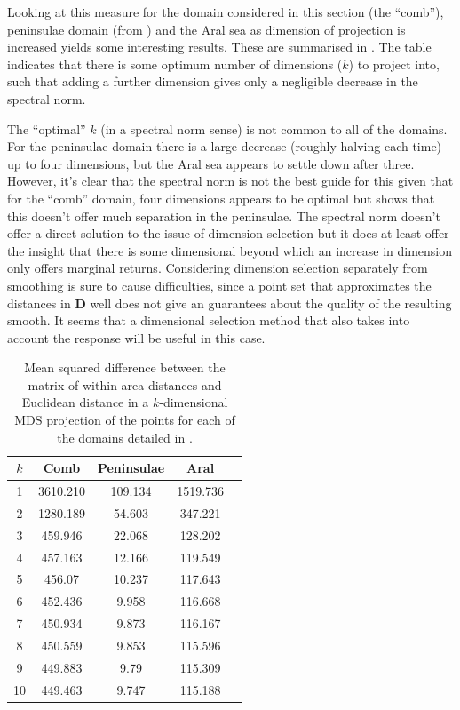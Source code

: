 Looking at this measure for the domain considered in this section (the ``comb''), peninsulae domain (from ) and the Aral sea as dimension of projection is increased yields some interesting results. These are summarised in . The table indicates that there is some optimum number of dimensions ($k$) to project into, such that adding a further dimension gives only a negligible decrease in the spectral norm. 

The ``optimal'' $k$ (in a spectral norm sense) is not common to all of the domains. For the peninsulae domain there is a large decrease (roughly halving each time) up to four dimensions, but the Aral sea appears to settle down after three. However, it's clear that the spectral norm is not the best guide for this given that for the ``comb'' domain, four dimensions appears to be optimal but  shows that this doesn't offer much separation in the peninsulae. The spectral norm doesn't offer a direct solution to the issue of dimension selection but it does at least offer the insight that there is some dimensional beyond which an increase in dimension only offers marginal returns. Considering dimension selection separately from smoothing is sure to cause difficulties, since a point set that approximates the distances in $\mathbf{D}$ well does not give an guarantees about the quality of the resulting smooth. It seems that a dimensional selection method that also takes into account the response will be useful in this case.

\begin{table}[htb]
\centering
\begin{tabular}{c c c c c}
$k$ & Comb  & Peninsulae & Aral\\ 
\hline
1  &  3610.210  &  109.134  &  1519.736 \\ 
2  &  1280.189  &  54.603  &  347.221 \\ 
3  &  459.946  &  22.068  &  128.202 \\ 
4  &  457.163  &  12.166  &  119.549 \\ 
5  &  456.07  &  10.237  &  117.643 \\ 
6  &  452.436  &  9.958  &  116.668 \\ 
7  &  450.934  &  9.873  &  116.167 \\ 
8  &  450.559  &  9.853  &  115.596 \\ 
9  &  449.883  &  9.79  &  115.309 \\ 
10  &  449.463 &  9.747  &  115.188 \\ 
\end{tabular}
\caption{Mean squared difference between the matrix of within-area distances and Euclidean distance in a $k$-dimensional MDS projection of the points for each of the domains detailed in .}
\label{increasek}
\end{table}

